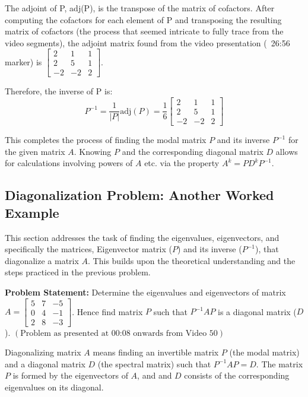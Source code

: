 \documentclass{article}
\begin{document}
The adjoint of P, adj(P), is the transpose of the matrix of cofactors. After computing the cofactors for each element of P and transposing the resulting matrix of cofactors (the process that seemed intricate to fully trace from the video segments), the adjoint matrix found from the video presentation (~26:56 marker) is $\begin{bmatrix} 2 & 1 & 1 \\ 2 & 5 & 1 \\ -2 & -2 & 2 \end{bmatrix}$.

Therefore, the inverse of P is:
\[ P^{-1} = \frac{1}{|P|}\text{adj}(P) = \frac{1}{6} \begin{bmatrix} 2 & 1 & 1 \\ 2 & 5 & 1 \\ -2 & -2 & 2 \end{bmatrix} \]

This completes the process of finding the modal matrix $P$ and its inverse $P^{-1}$ for the given matrix $A$. Knowing $P$ and the corresponding diagonal matrix $D$ allows for calculations involving powers of $A$ etc. via the property $A^k = PD^k P^{-1}$.


\subsection{Diagonalization Problem: Another Worked Example} %

This section addresses the task of finding the eigenvalues, eigenvectors, and specifically the matrices, Eigenvector matrix ($P$) and its inverse ($P^{-1}$), that diagonalize a matrix $A$. This builds upon the theoretical understanding and the steps practiced in the previous problem.

\textbf{Problem Statement:}
Determine the eigenvalues and eigenvectors of matrix $A = \begin{bmatrix} 5 & 7 & -5 \\ 0 & 4 & -1 \\ 2 & 8 & -3 \end{bmatrix}$. Hence find matrix $P$ such that $P^{-1}AP$ is a diagonal matrix ($D$). $( \text{Problem as presented at 00:08 onwards from Video 50} )$

Diagonalizing matrix $A$ means finding an invertible matrix $P$ (the modal matrix) and a diagonal matrix $D$ (the spectral matrix) such that $P^{-1}AP = D$. The matrix $P$ is formed by the eigenvectors of $A$, and and $D$ consists of the corresponding eigenvalues on its diagonal.
\end{document}
